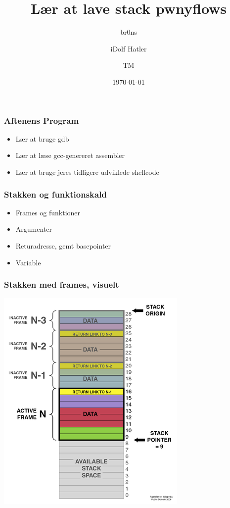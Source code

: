 \documentclass[slidestop,compress,mathserif, xcolor=table]{beamer}
\title[]{Lær at lave stack pwnyflows}
\author[br0ns \and iDolf Hatler \and TM]
       {br0ns \and iDolf Hatler \and TM}
\institute[DIKU]{Datalogisk institut, Københavns universitet}
\date[]{\today}
\begin{document}
\frame[plain]{\titlepage}

\begin{frame}[c]
    \frametitle{Aftenens Program}

    \begin{itemize}
        \pause\item Lær at bruge gdb
        \pause\item Lær at læse gcc-genereret assembler
        \pause\item Lær at bruge jeres tidligere udviklede shellcode
    \end{itemize}
\end{frame}

\begin{frame}[c]
    \frametitle{Stakken og funktionskald}
    \begin{itemize}
        \pause\item Frames og funktioner
        \pause\item Argumenter
        \pause\item Returadresse, gemt basepointer
        \pause\item Variable
    \end{itemize}
\end{frame}

\begin{frame}[c]
    \frametitle{Stakken med frames, visuelt}
    \begin{center}
        \includegraphics[height=.75\textheight]{ProgramCallStack2}
    \end{center}
\end{frame}
\end{document}
